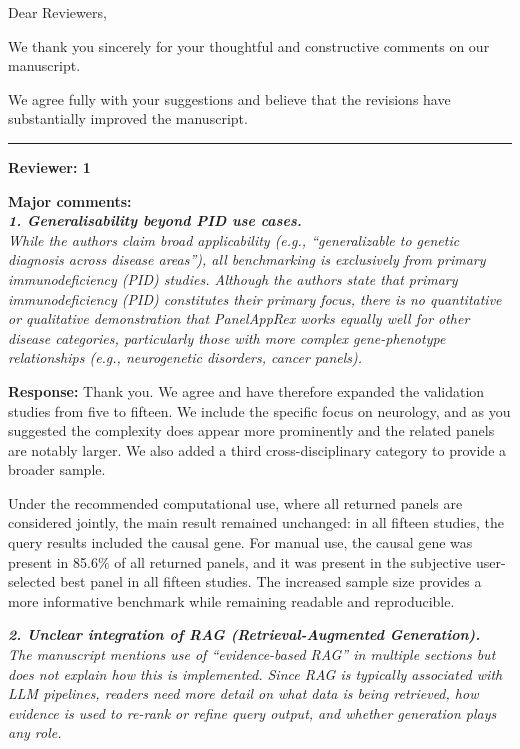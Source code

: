 \documentclass[12pt,a4paper]{letter}
\begin{document}
 
\raggedright
\begin{letter}{Dear Reviewers,}


\opening{}

We thank you sincerely for your thoughtful and constructive comments on our manuscript.

We agree fully with your suggestions and believe that the revisions have substantially improved the manuscript.

\noindent\rule{\textwidth}{0.4pt}

\textbf{Reviewer: 1}

\textbf{Major comments:}\\
\textit{\textbf{1. Generalisability beyond PID use cases.}\\
While the authors claim broad applicability (e.g., “generalizable to genetic diagnosis across disease areas”), all benchmarking is exclusively from primary immunodeficiency (PID) studies. Although the authors state that primary immunodeficiency (PID) constitutes their primary focus, there is no quantitative or qualitative demonstration that PanelAppRex works equally well for other disease categories, particularly those with more complex gene-phenotype relationships (e.g., neurogenetic disorders, cancer panels). }

\textbf{Response:} Thank you. We agree and have therefore expanded the validation studies from five to fifteen. We include the specific focus on neurology, and as you suggested the complexity does appear more prominently and the related panels are notably larger. We also added a third cross-disciplinary category to provide a broader sample. 

Under the recommended computational use, where all returned panels are considered jointly, the main result remained unchanged: in all fifteen studies, the query results included the causal gene. For manual use, the causal gene was present in 85.6\% of all returned panels, and it was present in the subjective user-selected best panel in all fifteen studies. The increased sample size provides a more informative benchmark while remaining readable and reproducible.


\textit{\textbf{2. Unclear integration of RAG (Retrieval-Augmented Generation).}\\
The manuscript mentions use of ``evidence-based RAG'' in multiple sections but does not explain how this is implemented. Since RAG is typically associated with LLM pipelines, readers need more detail on what data is being retrieved, how evidence is used to re-rank or refine query output, and whether generation plays any role.}
 

\end{letter}
\end{document}
